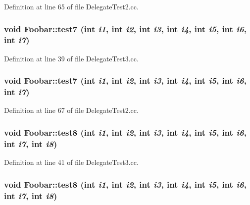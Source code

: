 Definition at line 65 of file Delegate\-Test2.cc.\hypertarget{structFoobar_a18}{
\subsubsection[test7]{\setlength{\rightskip}{0pt plus 5cm}void Foobar::test7 (int {\em i1}, int {\em i2}, int {\em i3}, int {\em i4}, int {\em i5}, int {\em i6}, int {\em i7})}}
\label{structFoobar_a18}




Definition at line 39 of file Delegate\-Test3.cc.\hypertarget{structFoobar_a7}{
\subsubsection[test7]{\setlength{\rightskip}{0pt plus 5cm}void Foobar::test7 (int {\em i1}, int {\em i2}, int {\em i3}, int {\em i4}, int {\em i5}, int {\em i6}, int {\em i7})}}
\label{structFoobar_a7}




Definition at line 67 of file Delegate\-Test2.cc.\hypertarget{structFoobar_a19}{
\subsubsection[test8]{\setlength{\rightskip}{0pt plus 5cm}void Foobar::test8 (int {\em i1}, int {\em i2}, int {\em i3}, int {\em i4}, int {\em i5}, int {\em i6}, int {\em i7}, int {\em i8})}}
\label{structFoobar_a19}




Definition at line 41 of file Delegate\-Test3.cc.\hypertarget{structFoobar_a8}{
\subsubsection[test8]{\setlength{\rightskip}{0pt plus 5cm}void Foobar::test8 (int {\em i1}, int {\em i2}, int {\em i3}, int {\em i4}, int {\em i5}, int {\em i6}, int {\em i7}, int {\em i8})}}
\label{structFoobar_a8}





